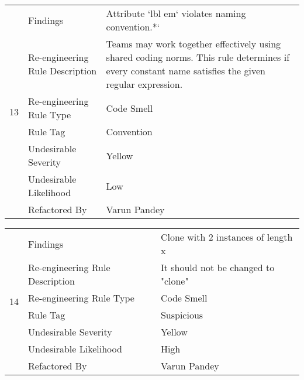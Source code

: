 \documentclass[12pt,english]{article}
\begin{document}
\begin{table}[!ht]
    \begin{tabularx}{\textwidth}{|c|l|X|}
    \hline
        \multirow{7}{*}{13} & Findings & Attribute ‘lbl em‘ violates naming convention.*‘ \\ \cline{2-3}
        & Re-engineering Rule Description & Teams may work together effectively using shared coding norms. This rule determines if every constant name satisfies the given regular expression.
 \\ \cline{2-3}
        & Re-engineering Rule Type & Code Smell \\ \cline{2-3}
        & Rule Tag & Convention \\ \cline{2-3}
        & Undesirable Severity & Yellow \\ \cline{2-3}
        & Undesirable Likelihood & Low \\ \cline{2-3}
        & Refactored By & Varun Pandey \\ \hline
    \end{tabularx}
\end{table}

\begin{table}[!ht]
    \begin{tabularx}{\textwidth}{|c|l|X|}
    \hline
        \multirow{7}{*}{14} & Findings & Clone with 2 instances of length x \\ \cline{2-3}
        & Re-engineering Rule Description & It should not be changed to "clone"
 \\ \cline{2-3}
        & Re-engineering Rule Type & Code Smell \\ \cline{2-3}
        & Rule Tag & Suspicious
 \\ \cline{2-3}
        & Undesirable Severity & Yellow \\ \cline{2-3}
        & Undesirable Likelihood & High \\ \cline{2-3}
        & Refactored By & Varun Pandey \\ \hline
    \end{tabularx}
\end{table}
\end{document}
